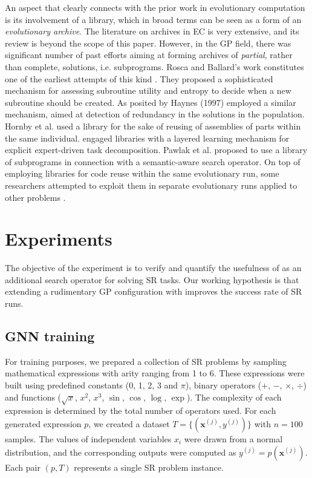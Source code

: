 An aspect that clearly connects \mname with the prior work in evolutionary computation is its involvement of a library, which in broad terms can be seen as a form of an \emph{evolutionary archive}. The literature on archives in EC is very extensive, and its review is beyond the scope of this paper. However, in the GP field, there was significant number of past efforts aiming at forming archives of \emph{partial}, rather than complete, solutions, i.e. subprograms. Rosca and Ballard's work constitutes one of the earliest attempts of this kind \cite{rosca:1996:aigp2}. They proposed a sophisticated mechanism for assessing subroutine utility and entropy to decide when a new subroutine should be created.  As posited by Haynes (1997) employed a similar mechanism, aimed at detection of redundancy in the solutions in the population. Hornby et al. \cite{hornby_alife02_s} used  a library for the sake of reusing of assemblies of parts within the same individual. \cite{bajurnow:2004:llfegsbisp} engaged libraries with a layered learning mechanism for explicit expert-driven task decomposition. Pawlak et al. \cite{Pawlak:2014:ieeeEC} proposed to use a library of subprograms in connection with a semantic-aware search operator. On top of employing libraries for code reuse within the same evolutionary run, some researchers attempted to exploit them in separate evolutionary runs applied to other problems \cite{ryan:2004:GPTP}.  






\section{Experiments}\label{sec:experiments}

The objective of the experiment is to verify and quantify the usefulness of \mname as an additional search operator for solving SR tasks. Our working hypothesis is that extending a rudimentary GP configuration with \mname improves the success rate of SR runs. 


\subsection{GNN training}\label{sec:gnn-training}
For training purposes, we prepared a collection of SR problems by sampling mathematical expressions with arity ranging from 1 to 6. These expressions were built using predefined constants (0, 1, 2, 3 and $\pi$), binary operators ($+$, $-$, $\times$, $\div$) and functions ($\sqrt{x}$, $x^2$, $x^3$, $\sin$, $\cos$, $\log$, $\exp$). The complexity of each expression is determined by the total number of operators used.
For each generated expression $p$, we created a dataset $T=\{(\mathbf{x}^{(j)},y^{(j)})\}$ with $n=100$ samples. The values of independent variables $x_i$ were drawn from a normal distribution, and the corresponding outputs were computed as $y^{(j)}=p(\mathbf{x}^{(j)})$. Each pair $(p,T)$ represents a single SR problem instance.

